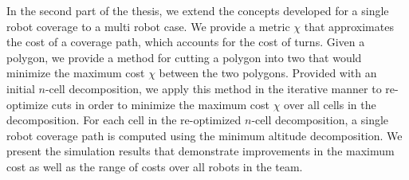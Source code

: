 In the second part of the thesis, we extend the concepts developed for a single robot coverage to a multi robot case. We provide a metric $\chi$ that approximates the cost of a coverage path, which accounts for the cost of turns. Given a polygon, we provide a method for cutting a polygon into two that would minimize the maximum cost $\chi$ between the two polygons. Provided with an initial $n$-cell decomposition, we apply this method in the iterative manner to re-optimize cuts in order to minimize the maximum cost $\chi$ over all cells in the decomposition. For each cell in the re-optimized $n$-cell decomposition, a single robot coverage path is computed using the minimum altitude decomposition. We present the simulation results that demonstrate improvements in the maximum cost as well as the range of costs over all robots in the team.




